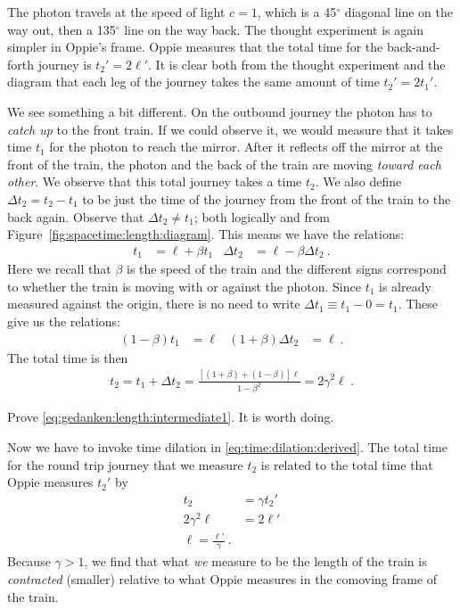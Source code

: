 \documentclass[12pt, oneside]{report}    %
\begin{document}
\begin{subappendices}
The photon travels at the speed of light $c=1$, which is a 45$^\circ$ diagonal line on the way out, then a 135$^\circ$ line on the way back. The thought experiment is again simpler in Oppie's frame. Oppie measures that the total time for the back-and-forth journey is $t_2' = 2\ell'$. It is clear both from the thought experiment and the diagram that each leg of the journey takes the same amount of time $t_2' = 2t_1'$.

We see something a bit different. On the outbound journey the photon has to \emph{catch up} to the front train. If we could observe it, we would measure that it takes time $t_1$ for the photon to reach the mirror. After it reflects off the mirror at the front of the train, the photon and the back of the train are moving \emph{toward each other}. We observe that this total journey takes a time $t_2$. We also define $\Delta t_2 = t_2 - t_1$ to be just the time of the journey from the front of the train to the back again. Observe that $\Delta t_2 \neq t_1$; both logically and from Figure~\ref{fig:spacetime:length:diagram}. This means we have the relations:
\begin{align}
t_1 &= \ell + \beta t_1
&
\Delta t_2 &= \ell - \beta \Delta t_2 \ .
\end{align}
Here we recall that $\beta$ is the speed of the train and the different signs correspond to whether the train is moving with or against the photon. Since $t_1$ is already measured against the origin, there is no need to write $\Delta t_1 \equiv t_1 - 0 = t_1$. These give us the relations:
\begin{align}
    (1-\beta)t_1 &= \ell & (1+\beta)\Delta t_2 &= \ell
    \ .
\end{align}
The total time is then
\begin{align}
    t_2 = t_1 + \Delta t_2 = \frac{\left[(1 + \beta) + (1-\beta)\right]\ell}{1-\beta^2}
    = 2\gamma^2 \ell \ .
    \label{eq:gedanken:length:intermediate1}
\end{align}
\begin{exercise}
Prove \eqref{eq:gedanken:length:intermediate1}. It is worth doing.
\end{exercise}
Now we have to invoke time dilation in \eqref{eq:time:dilation:derived}. The total time for the round trip journey that we measure $t_2$ is related to the total time that Oppie measures $t_2'$ by
\begin{align}
    t_2 &= \gamma t_2'
    \\
    2\gamma^2 \ell &= 2\ell' 
    \\
    \ell = \frac{\ell'}{\gamma}
    \label{eq:length:contraction:derived}
    \ .
\end{align}
Because $\gamma > 1$, we find that what \emph{we} measure to be the length of the train is \emph{contracted} (smaller) relative to what Oppie measures in the comoving frame of the train.



\end{subappendices}
\end{document}
